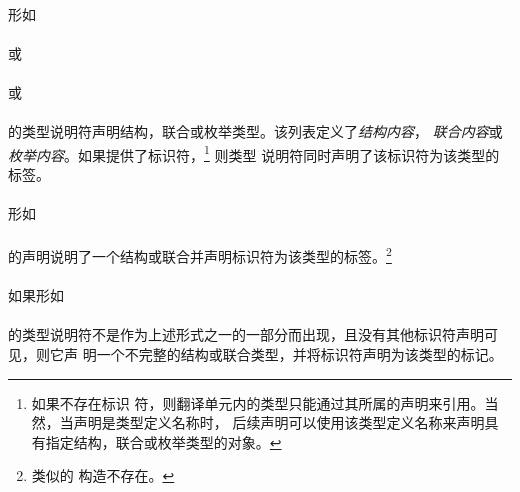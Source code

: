 \paragraph{}
形如                                                                          \\
\mbox{\hspace{4em} \tm{\{}
   \tm{\}}}                                       \\
或                                                                            \\
\mbox{\hspace{4em}  \tm{\{}
   \tm{\}}}                                               \\
或                                                                            \\
\mbox{\hspace{4em}  \tm{\{}
   \tm{, \}}}                                             \\
的类型说明符声明结构，联合或枚举类型。该列表定义了\textit{结构内容}，
\textit{联合内容}或\textit{枚举内容}。如果提供了标识符，\footnote{如果不存在标识
符，则翻译单元内的类型只能通过其所属的声明来引用。当然，当声明是类型定义名称时，
后续声明可以使用该类型定义名称来声明具有指定结构，联合或枚举类型的对象。} 则类型
说明符同时声明了该标识符为该类型的标签。

\paragraph{}
形如                                                                          \\
\mbox{\hspace{4em} \tm{;}}                     \\
的声明说明了一个结构或联合并声明标识符为该类型的标签。\footnote{类似的
构造不存在。\label{no-enum}}

\paragraph{}
如果形如                                                                      \\
\mbox{\hspace{4em}}                            \\
的类型说明符不是作为上述形式之一的一部分而出现，且没有其他标识符声明可见，则它声
明一个不完整的结构或联合类型，并将标识符声明为该类型的标记。\tsup{\ref{no-enum}}

